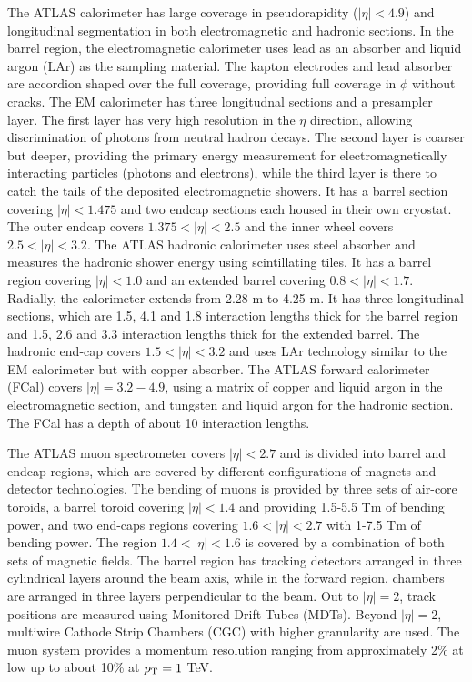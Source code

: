 %
The ATLAS calorimeter has large coverage in pseudorapidity ($|\eta|<4.9$)
and longitudinal segmentation in both electromagnetic and hadronic
sections.
In the barrel region, the electromagnetic calorimeter uses lead as an absorber
and liquid argon (LAr) as the sampling material.  
The kapton electrodes and lead absorber are accordion shaped over the full
coverage, providing full coverage in $\phi$ without cracks. 
The EM calorimeter has three longitudnal sections and a presampler layer.
The first layer has very high resolution
in the $\eta$ direction, allowing discrimination of photons from
neutral hadron decays.
The second layer is coarser but deeper, providing the primary energy
measurement for electromagnetically interacting particles (photons and
electrons), while the third layer is there to catch the tails of the
deposited electromagnetic showers.
It has a barrel section covering $|\eta|<1.475$ and two endcap sections
each housed in their own cryostat.  The outer endcap covers $1.375<|\eta|<2.5$
and the inner wheel covers $2.5<|\eta|<3.2$.
%
The ATLAS hadronic calorimeter uses steel absorber and measures the
hadronic shower energy using scintillating tiles.
It has a barrel region covering $|\eta|<1.0$ and an extended barrel
covering $0.8 < |\eta|< 1.7$.
Radially, the calorimeter extends from 2.28 m to 4.25 m.  It
has three longitudinal sections, which are 1.5, 4.1 and 1.8 interaction
lengths thick for the barrel region and 1.5, 2.6 and 3.3 interaction
lengths thick for the extended barrel.
%
The hadronic end-cap covers $1.5 < |\eta|< 3.2$ and uses LAr technology 
similar to the EM calorimeter but with copper absorber.
%
The ATLAS forward calorimeter (FCal) covers $|\eta|=3.2-4.9$, using
a matrix of copper and liquid argon in the electromagnetic section,
and tungsten and liquid argon for the hadronic section.
The FCal has a depth of about 10 interaction lengths.
%

The ATLAS muon spectrometer covers $|\eta|<2.7$ and is divided into
barrel and endcap regions, which are covered by different configurations
of magnets and detector technologies.
The bending of muons is provided by three sets of air-core toroids,
a barrel toroid covering $|\eta|<1.4$ and providing 1.5-5.5 Tm of bending power, 
and two end-caps regions covering $1.6 < |\eta| < 2.7$ with 1-7.5 Tm of
bending power.  The region $1.4 < |\eta| <1.6$ is covered by 
a combination of both sets of magnetic fields.
The barrel region has tracking detectors arranged in three cylindrical 
layers around the beam axis, while in the forward region, chambers are
arranged in three layers perpendicular to the beam.
Out to $|\eta|=2$, track positions are measured using Monitored Drift Tubes (MDTs).
Beyond $|\eta|=2$, multiwire Cathode Strip Chambers (CGC) with higher granularity
are used.
The muon system provides a momentum resolution ranging from approximately 2\% at 
low \pT up to about 10\% at $\mbox{$p_{\mathrm{T}}$}=1$ TeV.
%

